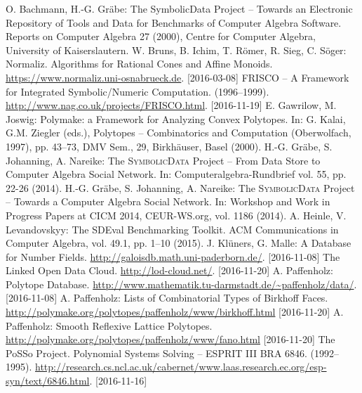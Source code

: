 \documentclass{mathincs}
\newcommand{\SD}{\textsc{Symbo\-lic\-Data}}
\begin{document}
\raggedright
\begin{thebibliography}{00}
\setlength{\itemsep}{-1mm}
\footnotesize
{} O. Bachmann, H.-G. Gr\"abe: The SymbolicData Project --
  Towards an Electronic Repository of Tools and Data for Benchmarks of Computer
  Algebra Software. Reports on Computer Algebra 27 (2000), Centre for Computer
  Algebra, University of Kaiserslautern.
 W. Bruns, B. Ichim, T. R\"omer, R. Sieg, C. S\"oger:
  Normaliz.  Algorithms for Rational Cones and Affine Monoids.
  \url{https://www.normaliz.uni-osnabrueck.de}. [2016-03-08]
 FRISCO -- A Framework for Integrated Symbolic/Numeric
  Computation. (1996--1999).  \url{http://www.nag.co.uk/projects/FRISCO.html}.
  [2016-11-19]
 E. Gawrilow, M. Joswig: Polymake: a Framework for Analyzing
  Convex Polytopes. In: G. Kalai, G.M. Ziegler (eds.), Polytopes --
  Combinatorics and Computation (Oberwolfach, 1997), pp. 43--73, DMV Sem., 29,
  Birkh\"auser, Basel (2000).
 H.-G. Gr\"abe, S. Johanning, A. Nareike: The {\SD} Project --
  From Data Store to Computer Algebra Social Network. In:
  Computeralgebra-Rundbrief vol. 55, pp. 22-26 (2014).
 H.-G. Gr\"abe, S. Johanning, A. Nareike: The {\SD} Project --
  Towards a Computer Algebra Social Network. In: Workshop and Work in Progress
  Papers at CICM 2014, CEUR-WS.org, vol. 1186 (2014).
 A. Heinle, V. Levandovskyy: The SDEval Benchmarking
  Toolkit. ACM Communications in Computer Algebra, vol. 49.1, pp. 1--10 (2015).
 J. Kl\"uners, G. Malle: A Database for Number Fields.
  \url{http://galoisdb.math.uni-paderborn.de/}. [2016-11-08]
 The Linked Open Data Cloud.  \url{http://lod-cloud.net/}.
  [2016-11-20]
 A. Paffenholz: Polytope Database.
  \url{http://www.mathematik.tu-darmstadt.de/~paffenholz/data/}.  [2016-11-08]
 A. Paffenholz: Lists of Combinatorial Types of Birkhoff
  Faces.  \url{http://polymake.org/polytopes/paffenholz/www/birkhoff.html}
  [2016-11-20]
 A. Paffenholz: Smooth Reflexive Lattice Polytopes.
  \url{http://polymake.org/polytopes/paffenholz/www/fano.html} [2016-11-20]
 The PoSSo Project. Polynomial Systems Solving -- ESPRIT III BRA
  6846.  (1992--1995).
  \url{http://research.cs.ncl.ac.uk/cabernet/www.laas.research.ec.org/esp-syn/text/6846.html}. 
      [2016-11-16]

\end{thebibliography}
\end{document}
